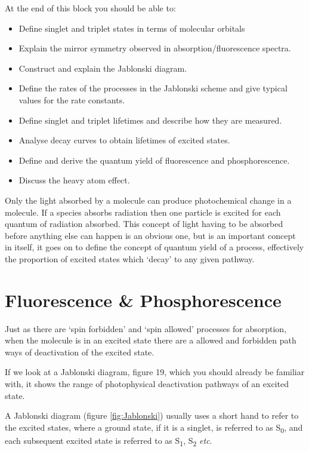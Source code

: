 \documentclass[
]{book}
\begin{document}
At the end of this block you should be able to:

\begin{itemize}
\item
  Define singlet and triplet states in terms of molecular orbitals
\item
  Explain the mirror symmetry observed in absorption/fluorescence spectra.
\item
  Construct and explain the Jablonski diagram.
\item
  Define the rates of the processes in the Jablonski scheme and give typical values for the rate constants.
\item
  Define singlet and triplet lifetimes and describe how they are measured.
\item
  Analyse decay curves to obtain lifetimes of excited states.
\item
  Define and derive the quantum yield of fluorescence and phosphorescence.
\item
  Discuss the heavy atom effect.
\end{itemize}

Only the light absorbed by a molecule can produce photochemical change in a molecule. If a species absorbs radiation then one particle is excited for each quantum of radiation absorbed. This concept of light having to be absorbed before anything else can happen is an obvious one, but is an important concept in itself, it goes on to define the concept of quantum yield of a process, effectively the proportion of excited states which `decay' to any given pathway.

\hypertarget{sec:FluorPhos}{%
\section{Fluorescence \& Phosphorescence}\label{sec:FluorPhos}}

Just as there are `spin forbidden' and `spin allowed' processes for absorption, when the molecule is in an excited state there are a allowed and forbidden path ways of deactivation of the excited state.

If we look at a Jablonski diagram, figure 19, which you should already be familiar with, it shows the range of photophysical deactivation pathways of an excited state.

A Jablonski diagram (figure \ref{fig:Jablonski}) usually uses a short hand to refer to the excited states, where a ground state, if it is a singlet, is referred to as S\textsubscript{0}, and each subsequent excited state is referred to as S\textsubscript{1}, S\textsubscript{2} \emph{etc}.
\end{document}
